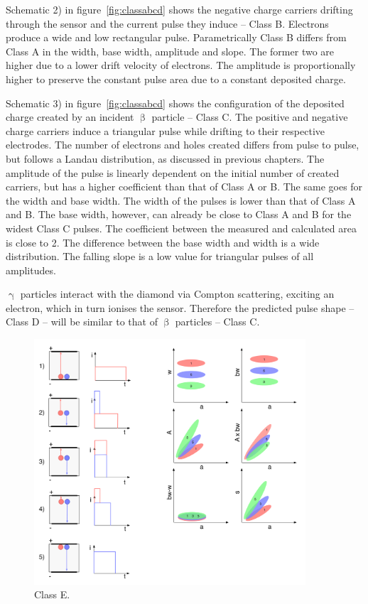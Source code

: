 Schematic 2) in figure~\ref{fig:classabcd} shows the negative charge carriers drifting through the sensor and the current pulse they induce -- Class B. Electrons produce a wide and low rectangular pulse. Parametrically Class B differs from Class A in the width, base width, amplitude and slope. The former two are higher due to a lower drift velocity of electrons. The amplitude is proportionally higher to preserve the constant pulse area due to a constant deposited charge.

Schematic 3) in figure~\ref{fig:classabcd} shows the configuration of the deposited charge created by an incident $\upbeta$ particle -- Class C. The positive and negative charge carriers induce a triangular pulse while drifting to their respective electrodes. The number of electrons and holes created differs from pulse to pulse, but follows a Landau distribution, as discussed in previous chapters. The amplitude of the pulse is linearly dependent on the initial number of created carriers, but has a higher coefficient than that of Class A or B. The same goes for the width and base width. The width of the pulses is lower than that of Class A and B. The base width, however, can already be close to Class A and B for the widest Class C pulses. The coefficient between the measured and calculated area is close to 2. The difference between the base width and width is a wide distribution. The falling slope is a low value for triangular pulses of all amplitudes.

$\upgamma$ particles interact with the diamond via Compton scattering, exciting an electron, which in turn ionises the sensor. Therefore the predicted pulse shape -- Class D -- will be similar to that of $\upbeta$ particles -- Class C. 





\clearpage

\begin{figure}[!t]
\centering
\includegraphics[width=0.9\textwidth]{05_current_monitoring/plots/classE}
\caption{Class E.}
\label{fig:classe}
\end{figure}

